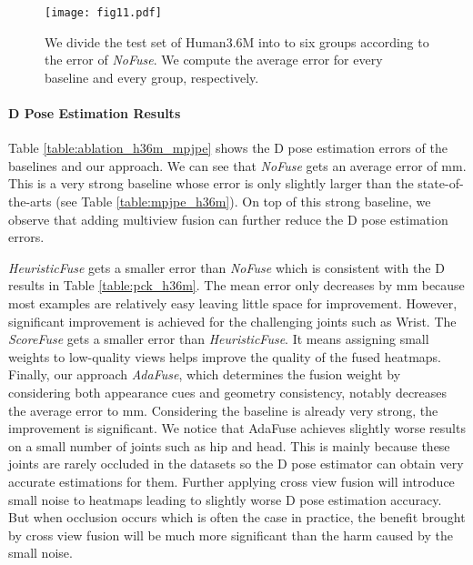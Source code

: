 \begin{figure}[h]
    \centering
    \texttt{[image: fig11.pdf]}
    \caption{We divide the test set of Human3.6M into to six groups according to the error of \emph{NoFuse}. We compute the average error for every baseline and every group, respectively.}
    \label{fig:h36m_mpjpe_scale}
\end{figure}







\paragraph{D Pose Estimation Results}
Table \ref{table:ablation_h36m_mpjpe} shows the D pose estimation errors of the baselines and our approach. We can see that \emph{NoFuse} gets an average error of mm. This is a very strong baseline whose error is only slightly larger than the state-of-the-arts (see Table \ref{table:mpjpe_h36m}). On top of this strong baseline, we observe that adding multiview fusion can further reduce the D pose estimation errors.


\emph{HeuristicFuse} gets a smaller error than \emph{NoFuse} which is consistent with the D results in Table \ref{table:pck_h36m}. The mean error only decreases by mm because most examples are relatively easy leaving little space for improvement. However, significant improvement is achieved for the challenging joints such as Wrist. The \emph{ScoreFuse} gets a smaller error than \emph{HeuristicFuse}. It means assigning small weights to low-quality views helps improve the quality of the fused heatmaps. Finally, our approach \emph{AdaFuse}, which determines the fusion weight by considering both appearance cues and geometry consistency, notably decreases the average error to mm. Considering the baseline is already very strong, the improvement is significant.
{We notice that AdaFuse achieves slightly worse results on a small number of joints such as hip and head. This is mainly because these joints are rarely occluded in the datasets so the D pose estimator can obtain very accurate estimations for them. Further applying cross view fusion will introduce small noise to heatmaps leading to slightly worse D pose estimation accuracy. But when occlusion occurs which is often the case in practice, the benefit brought by cross view fusion will be much more significant than the harm caused by the small noise.}



